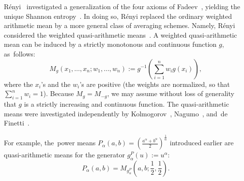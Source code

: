 \documentclass[entropy,article,accept,oneauthor,pdftex,entropy]{Definitions/mdpi}
\begin{document}
R\'enyi~\cite{Renyi-1961} investigated a generalization of the four axioms of Fadeev~\cite{Fadeev-1957}, yielding the unique Shannon entropy~\cite{Csiszar-2008}.  
In doing so, R\'enyi replaced the ordinary weighted arithmetic mean by a more general class of averaging schemes.
Namely, R\'enyi considered the weighted quasi-arithmetic means~\cite{Kolmogorov-1930}.
A  weighted quasi-arithmetic mean can be induced by a strictly monotonous and continuous function $g$, as~follows:
\begin{equation}
M_g(x_1,\ldots,x_n;w_1,\ldots,w_n) := g^{-1}\left(\sum_{i=1}^n w_i g(x_i)\right),
\end{equation}
where the $x_i$'s and the $w_i$'s are positive (the weights are normalized, so that $\sum_{i=1}^n w_i=1$).
Because $M_g=M_{-g}$, we may assume without loss of generality that $g$ is a strictly increasing and continuous function.
The quasi-arithmetic means were investigated independently by Kolmogorov~\cite{Kolmogorov-1930}, Nagumo~\cite{Nagumo-1930}, and~de Finetti~\cite{Finetti-1931}.

For example, the~{power means} $P_\alpha(a,b)=\left(\frac{a^\alpha+b^\alpha}{2}\right)^{\frac{1}{\alpha}}$ 
introduced earlier are quasi-arithmetic means for the generator $g_\alpha^P(u):=u^\alpha$:
\begin{equation}
P_\alpha(a,b)=M_{g_\alpha^P}\left(a,b;\frac{1}{2},\frac{1}{2}\right).
\end{equation}
\end{document}
